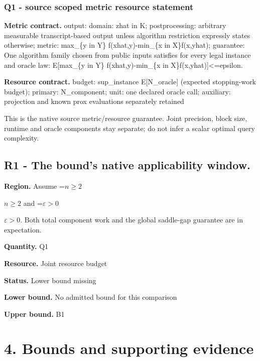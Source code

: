 \documentclass[10pt,a4paper]{article}
\newcommand{\AtlasMath}[1]{\par\begingroup\centering\setbox0=\hbox{$\displaystyle #1$}\ifdim\wd0>1.4\linewidth\typeout{ATLAS WIDE FORMULA: \the\wd0}\fi\ifdim\wd0>\linewidth\resizebox{\linewidth}{!}{\box0}\else\box0\fi\par\endgroup}
\newcommand{\AtlasInlineMath}[1]{\begingroup\setbox0=\hbox{$#1$}\ifdim\wd0>.4\linewidth\endgroup\AtlasMath{#1}\else\endgroup$#1$\fi}
\begin{document}
\subsubsection{Q1 - source scoped metric resource statement}


\textbf{Metric contract.} output: domain: zhat in K; postprocessing: arbitrary measurable transcript-based output unless algorithm restriction expressly states otherwise; metric: max\_\{y in Y\} f(xhat,y)-min\_\{x in X\}f(x,yhat); guarantee: One algorithm family chosen from public inputs satisfies for every legal instance and oracle law: E[max\_\{y in Y\} f(xhat,y)-min\_\{x in X\}f(x,yhat)]<=epsilon.



\textbf{Resource contract.} budget: sup\_instance E[N\_oracle] (expected stopping-work budget); primary: N\_component; unit: one declared oracle call; auxiliary: projection and known prox evaluations separately retained



This is the native source metric/resource guarantee. Joint precision, block size, runtime and oracle components stay separate; do not infer a scalar optimal query complexity.



\subsection{R1 - The bound’s native applicability window.}


\textbf{Region.} Assume \AtlasInlineMath{n\ge2} and \AtlasInlineMath{\varepsilon>0}. Both total component work and the global saddle-gap guarantee are in expectation.



\textbf{Quantity.} Q1



\textbf{Resource.} Joint resource budget



\textbf{Status.} Lower bound missing



\textbf{Lower bound.} No admitted bound for this comparison



\textbf{Upper bound.} B1



\section{4. Bounds and supporting evidence}
\end{document}
